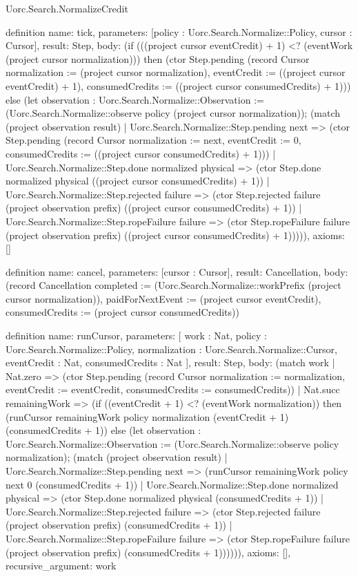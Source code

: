 \begin{lexlean}{Uorc.Search.NormalizeCredit}
\begin{semanticmodule}
definition{
  name: tick,
  parameters: [policy : Uorc.Search.Normalize::Policy, cursor : Cursor],
  result: Step,
  body: (if (((project cursor eventCredit) + 1) <? (eventWork (project cursor normalization))) then (ctor Step.pending (record Cursor {normalization := (project cursor normalization), eventCredit := ((project cursor eventCredit) + 1), consumedCredits := ((project cursor consumedCredits) + 1)})) else (let observation : Uorc.Search.Normalize::Observation := (Uorc.Search.Normalize::observe policy (project cursor normalization)); (match (project observation result)
    | Uorc.Search.Normalize::Step.pending next => (ctor Step.pending (record Cursor {normalization := next, eventCredit := 0, consumedCredits := ((project cursor consumedCredits) + 1)}))
    | Uorc.Search.Normalize::Step.done normalized physical => (ctor Step.done normalized physical ((project cursor consumedCredits) + 1))
    | Uorc.Search.Normalize::Step.rejected failure => (ctor Step.rejected failure (project observation prefix) ((project cursor consumedCredits) + 1))
    | Uorc.Search.Normalize::Step.ropeFailure failure => (ctor Step.ropeFailure failure (project observation prefix) ((project cursor consumedCredits) + 1))))),
  axioms: []
}

definition{
  name: cancel,
  parameters: [cursor : Cursor],
  result: Cancellation,
  body: (record Cancellation {completed := (Uorc.Search.Normalize::workPrefix (project cursor normalization)), paidForNextEvent := (project cursor eventCredit), consumedCredits := (project cursor consumedCredits)})
}

definition{
  name: runCursor,
  parameters: [
    work : Nat,
    policy : Uorc.Search.Normalize::Policy,
    normalization : Uorc.Search.Normalize::Cursor,
    eventCredit : Nat,
    consumedCredits : Nat
  ],
  result: Step,
  body: (match work
    | Nat.zero => (ctor Step.pending (record Cursor {normalization := normalization, eventCredit := eventCredit, consumedCredits := consumedCredits}))
    | Nat.succ remainingWork => (if ((eventCredit + 1) <? (eventWork normalization)) then (runCursor remainingWork policy normalization (eventCredit + 1) (consumedCredits + 1)) else (let observation : Uorc.Search.Normalize::Observation := (Uorc.Search.Normalize::observe policy normalization); (match (project observation result)
      | Uorc.Search.Normalize::Step.pending next => (runCursor remainingWork policy next 0 (consumedCredits + 1))
      | Uorc.Search.Normalize::Step.done normalized physical => (ctor Step.done normalized physical (consumedCredits + 1))
      | Uorc.Search.Normalize::Step.rejected failure => (ctor Step.rejected failure (project observation prefix) (consumedCredits + 1))
      | Uorc.Search.Normalize::Step.ropeFailure failure => (ctor Step.ropeFailure failure (project observation prefix) (consumedCredits + 1)))))),
  axioms: [],
  recursive_argument: work
}


\end{semanticmodule}
\end{lexlean}
